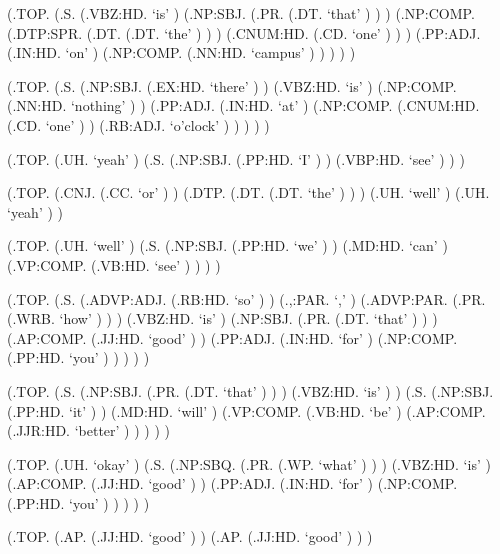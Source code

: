 \documentclass[10pt]{article}
\begin{document}
\begin{parsetree}  (.TOP. (.S. (.VBZ:HD. `is' ) (.NP:SBJ. (.PR. (.DT. `that' ) ) ) (.NP:COMP. (.DTP:SPR. (.DT. (.DT. `the' ) ) ) (.CNUM:HD. (.CD. `one' ) ) ) (.PP:ADJ. (.IN:HD. `on' ) (.NP:COMP. (.NN:HD. `campus' ) ) ) ) ) \end{parsetree}

\begin{parsetree}  (.TOP. (.S. (.NP:SBJ. (.EX:HD. `there' ) ) (.VBZ:HD. `is' ) (.NP:COMP. (.NN:HD. `nothing' ) ) (.PP:ADJ. (.IN:HD. `at' ) (.NP:COMP. (.CNUM:HD. (.CD. `one' ) ) (.RB:ADJ. `o'clock' ) ) ) ) ) \end{parsetree}

\begin{parsetree}  (.TOP. (.UH. `yeah' ) (.S. (.NP:SBJ. (.PP:HD. `I' ) ) (.VBP:HD. `see' ) ) ) \end{parsetree}

\begin{parsetree}  (.TOP. (.CNJ. (.CC. `or' ) ) (.DTP. (.DT. (.DT. `the' ) ) ) (.UH. `well' ) (.UH. `yeah' ) ) \end{parsetree}

\begin{parsetree}  (.TOP. (.UH. `well' ) (.S. (.NP:SBJ. (.PP:HD. `we' ) ) (.MD:HD. `can' ) (.VP:COMP. (.VB:HD. `see' ) ) ) ) \end{parsetree}

\begin{parsetree}  (.TOP. (.S. (.ADVP:ADJ. (.RB:HD. `so' ) ) (.,:PAR. `,' ) (.ADVP:PAR. (.PR. (.WRB. `how' ) ) ) (.VBZ:HD. `is' ) (.NP:SBJ. (.PR. (.DT. `that' ) ) ) (.AP:COMP. (.JJ:HD. `good' ) ) (.PP:ADJ. (.IN:HD. `for' ) (.NP:COMP. (.PP:HD. `you' ) ) ) ) ) \end{parsetree}

\begin{parsetree}  (.TOP. (.S. (.NP:SBJ. (.PR. (.DT. `that' ) ) ) (.VBZ:HD. `is' ) ) (.S. (.NP:SBJ. (.PP:HD. `it' ) ) (.MD:HD. `will' ) (.VP:COMP. (.VB:HD. `be' ) (.AP:COMP. (.JJR:HD. `better' ) ) ) ) ) \end{parsetree}

\begin{parsetree}  (.TOP. (.UH. `okay' ) (.S. (.NP:SBQ. (.PR. (.WP. `what' ) ) ) (.VBZ:HD. `is' ) (.AP:COMP. (.JJ:HD. `good' ) ) (.PP:ADJ. (.IN:HD. `for' ) (.NP:COMP. (.PP:HD. `you' ) ) ) ) ) \end{parsetree}

\begin{parsetree}  (.TOP. (.AP. (.JJ:HD. `good' ) ) (.AP. (.JJ:HD. `good' ) ) ) \end{parsetree}
\end{document}
